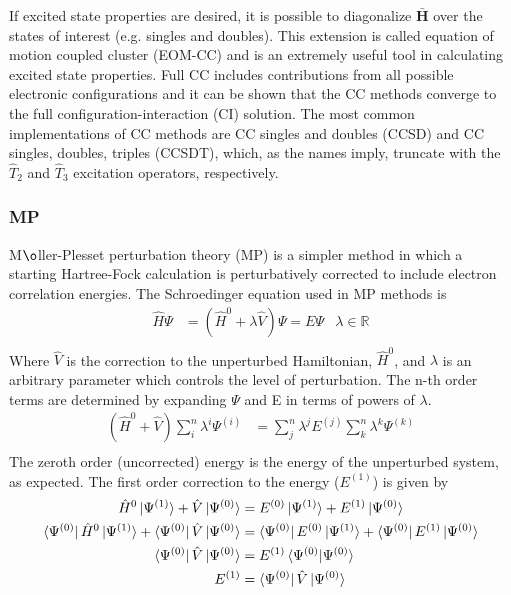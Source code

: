 \documentclass[letterpaper, 12pt, titlepage]{article}
\begin{document}
If excited state properties are desired, it is possible to diagonalize $\mathbf{\bar{H}}$ over the states of interest (e.g. singles and doubles). This extension is called equation of motion coupled cluster (EOM-CC) and is an extremely useful tool in calculating excited state properties. Full CC includes contributions from all possible electronic configurations and it can be shown that the  CC methods converge to the full configuration-interaction (CI) solution. The most common implementations of CC methods are CC singles and doubles (CCSD) and CC singles, doubles, triples (CCSDT), which, as the names imply, truncate with the $\hat{T}_2$ and $\hat{T}_3$ excitation operators, respectively.\\

\subsubsection{MP}
M$\o$ller-Plesset perturbation theory (MP) is a simpler method in which a starting Hartree-Fock calculation is perturbatively corrected to include electron correlation energies. The Schroedinger equation used in MP methods is
\begin{align*}
\hat{H}\Psi&=(\hat{H}^0 +\lambda \hat{V}) \Psi=E\Psi &\lambda \in \mathbb{R}\\
\end{align*} 
Where $\hat{V}$ is the correction to the unperturbed Hamiltonian, $\hat{H}^0$, and $\lambda$ is an arbitrary parameter which controls the level of perturbation. The n-th order terms are determined by expanding $\Psi$ and E in terms of powers of $\lambda$.
\begin{align*}
(\hat{H}^0 + \hat{V}) \sum\limits_i^n \lambda^i \Psi^{(i)} &= \sum\limits_j^n \lambda^j E^{(j)} \sum\limits_k^n \lambda^k \Psi^{(k)}  \\
\end{align*}
The zeroth order (uncorrected) energy is the energy of the unperturbed system, as expected. The first order correction to the energy ($E^{(1)}$) is given by
\begin{align*}
\hat{H}^0 \ket{\Psi^{(1)}} + \hat{V}\ket{\Psi^{(0)}}&=E^{(0)}\ket{\Psi^{(1)}} + E^{(1)}\ket{\Psi^{(0)}}\\
\bra{\Psi^{(0)}}\hat{H}^0 \ket{\Psi^{(1)}} + \bra{\Psi^{(0)}}\hat{V}\ket{\Psi^{(0)}} &=\bra{\Psi^{(0)}}E^{(0)}\ket{\Psi^{(1)}} +\bra{\Psi^{(0)}} E^{(1)}\ket{\Psi^{(0)}}\\
\bra{\Psi^{(0)}}\hat{V}\ket{\Psi^{(0)}} &= E^{(1)} \braket{\Psi^{(0)} | \Psi^{(0)}}\\
E^{(1)} &= \bra{\Psi^{(0)}}\hat{V}\ket{\Psi^{(0)}} 
\end{align*}
\end{document}
